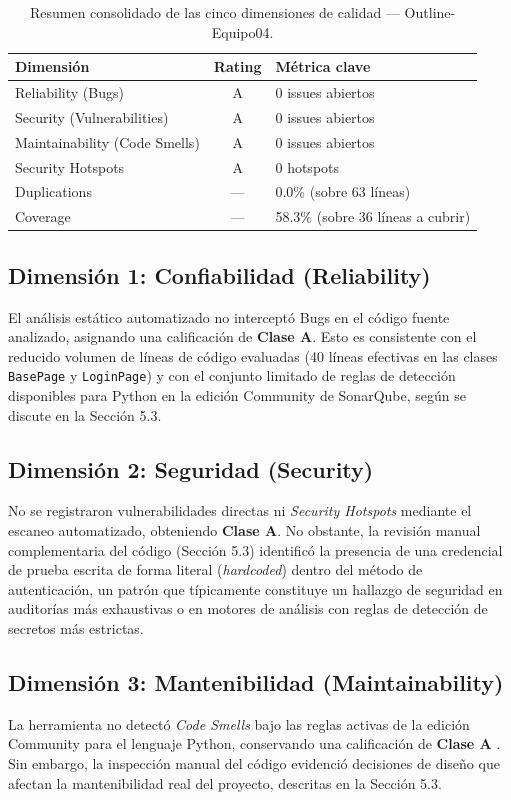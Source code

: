 \documentclass[12pt,oneside]{report}
\begin{document}
\begin{table}[H]
\centering
\caption{Resumen consolidado de las cinco dimensiones de calidad — Outline-Equipo04.}
\small
\begin{tabularx}{\textwidth}{|X|c|X|}
\hline
\textbf{Dimensión} & \textbf{Rating} & \textbf{Métrica clave} \\
\hline
Reliability (Bugs) & A & 0 issues abiertos \\
\hline
Security (Vulnerabilities) & A & 0 issues abiertos \\
\hline
Maintainability (Code Smells) & A & 0 issues abiertos \\
\hline
Security Hotspots & A & 0 hotspots \\
\hline
Duplications & --- & 0.0\% (sobre 63 líneas) \\
\hline
Coverage & --- & 58.3\% (sobre 36 líneas a cubrir) \\
\hline
\end{tabularx}
\end{table}

\subsection{Dimensión 1: Confiabilidad (Reliability)}
El análisis estático automatizado no interceptó Bugs en el código fuente analizado, asignando una calificación de \textbf{Clase A}. Esto es consistente con el reducido volumen de líneas de código evaluadas (40 líneas efectivas en las clases \texttt{BasePage} y \texttt{LoginPage}) y con el conjunto limitado de reglas de detección disponibles para Python en la edición Community de SonarQube, según se discute en la Sección 5.3.

\subsection{Dimensión 2: Seguridad (Security)}
No se registraron vulnerabilidades directas ni \textit{Security Hotspots} mediante el escaneo automatizado, obteniendo \textbf{Clase A}. No obstante, la revisión manual complementaria del código (Sección 5.3) identificó la presencia de una credencial de prueba escrita de forma literal (\textit{hardcoded}) dentro del método de autenticación, un patrón que típicamente constituye un hallazgo de seguridad en auditorías más exhaustivas o en motores de análisis con reglas de detección de secretos más estrictas.

\subsection{Dimensión 3: Mantenibilidad (Maintainability)}
La herramienta no detectó \textit{Code Smells} bajo las reglas activas de la edición Community para el lenguaje Python, conservando una calificación de \textbf{Clase A} \parencite{fowler2018}. Sin embargo, la inspección manual del código evidenció decisiones de diseño que afectan la mantenibilidad real del proyecto, descritas en la Sección 5.3.
\end{document}
